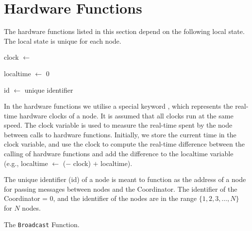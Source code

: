 \section{Hardware Functions}\label{sec:hwfuncspseudo}
The hardware functions listed in this section depend on the following local state. The local state is unique for each node.\smallbreak

clock $\leftarrow$ \KwNow

localtime $\leftarrow$ 0

id $\leftarrow$ unique identifier \smallbreak

In the hardware functions we utilise a special keyword \KwNow, which represents the real-time hardware clocks of a node. It is assumed that all clocks run at the same speed. The clock variable is used to measure the real-time spent by the node between calls to hardware functions. Initially, we store the current time in the clock variable, and use the clock to compute the real-time difference between the calling of hardware functions and add the difference to the localtime variable (e.g., localtime $\leftarrow$ (\KwNow $-$ clock) $+$ localtime).

The unique identifier (id) of a node is meant to function as the address of a node for passing messages between nodes and the Coordinator. The identifier of the Coordinator = $0$, and the identifier of the nodes are in the range $\{ 1, 2, 3, \ldots, N \}$ for $N$ nodes.



\begin{algorithm}[ht]
    \DontPrintSemicolon
    

    \caption{The \texttt{Broadcast} Function.}
    \label{algo:hwfuncstransmit}
\end{algorithm}

